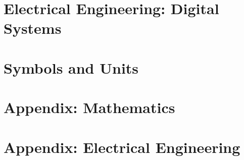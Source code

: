 \documentclass{article}
\newcommand{\LoadCheatsheet}[1]{{}}
\newcommand{\LoadAppendix}[1]{{}}
\begin{document}
\newpage
\section{Electrical Engineering: Digital Systems}
\label{sec:ee-digital}

    \LoadCheatsheet{electrical-engineering-digital-systems/1-basics}
    \newpage
    \LoadCheatsheet{electrical-engineering-digital-systems/2-digital-analogue-interfacing}

\newpage
\section{Symbols and Units}
\label{sec:units}

    \LoadCheatsheet{symbols-and-units}

\newpage
{}

\section{Appendix: Mathematics}%
\label{sec:appendix-math}

    \LoadAppendix{mathematics}

\newpage
\section{Appendix: Electrical Engineering}%
\label{sec:appendix-ee}

    \LoadAppendix{electrical-engineering/inductors-and-inductive-coupling}
    \newpage
    \LoadAppendix{electrical-engineering/amplifier-analysis}
\end{document}
